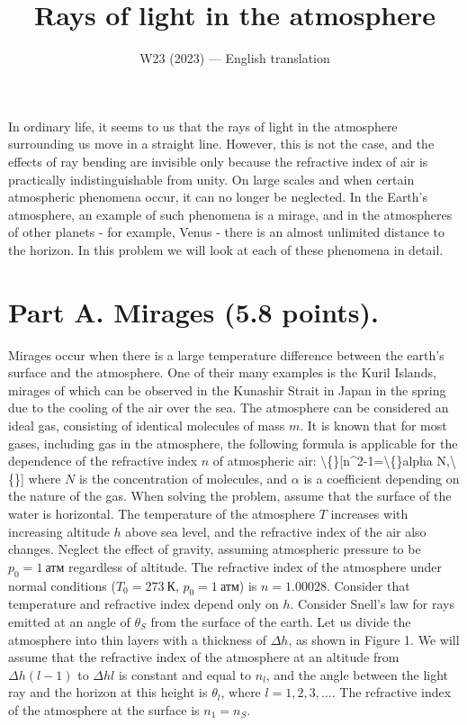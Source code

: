 \documentclass[11pt,a4paper]{article}
\title{\textbf{Rays of light in the atmosphere}}
\author{\normalsize W23 (2023) --- English translation}
\date{}
\begin{document}
\maketitle

In ordinary life, it seems to us that the rays of light in the atmosphere surrounding us move in a straight line. However, this is not the case, and the effects of ray bending are invisible only because the refractive index of air is practically indistinguishable from unity. On large scales and when certain atmospheric phenomena occur, it can no longer be neglected. In the Earth's atmosphere, an example of such phenomena is a mirage, and in the atmospheres of other planets - for example, Venus - there is an almost unlimited distance to the horizon. In this problem we will look at each of these phenomena in detail.

\section*{Part A. Mirages (5.8 points).}

Mirages occur when there is a large temperature difference between the earth's surface and the atmosphere. One of their many examples is the Kuril Islands, mirages of which can be observed in the Kunashir Strait in Japan in the spring due to the cooling of the air over the sea. The atmosphere can be considered an ideal gas, consisting of identical molecules of mass $m$. It is known that for most gases, including gas in the atmosphere, the following formula is applicable for the dependence of the refractive index $n$ of atmospheric air: \textbackslash\{\}[n^2-1=\textbackslash\{\}alpha N,\textbackslash\{\}] where $N$ is the concentration of molecules, and $\alpha$ is a coefficient depending on the nature of the gas. When solving the problem, assume that the surface of the water is horizontal. The temperature of the atmosphere $T$ increases with increasing altitude $h$ above sea level, and the refractive index of the air also changes. Neglect the effect of gravity, assuming atmospheric pressure to be $p_0=1~\text{атм}$ regardless of altitude. The refractive index of the atmosphere under normal conditions ($T_0=273~\text{К}$, $p_0=1~\text{атм}$) is $n=1.00028$. Consider that temperature and refractive index depend only on $h$. Consider Snell's law for rays emitted at an angle of $\theta_S$ from the surface of the earth. Let us divide the atmosphere into thin layers with a thickness of $\Delta h$, as shown in Figure 1. We will assume that the refractive index of the atmosphere at an altitude from $\Delta h(l-1)$ to $\Delta hl$ is constant and equal to $n_l$, and the angle between the light ray and the horizon at this height is $\theta_l$, where $l=1,2,3,\ldots$. The refractive index of the atmosphere at the surface is $n_1=n_S$.
\end{document}
